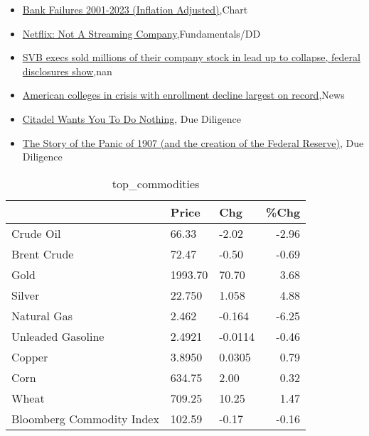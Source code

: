 \documentclass{article}%
\begin{document}
%
\begin{itemize}%
\item%
\href{https://reddit.com/r/wallstreetbets/comments/11ukpfj/bank\_failures\_20012023\_inflation\_adjusted/}{Bank Failures 2001-2023 (Inflation Adjusted)},Chart%
\item%
\href{https://reddit.com/r/StockMarket/comments/11umsba/netflix\_not\_a\_streaming\_company/}{Netflix: Not A Streaming Company},Fundamentals/DD%
\item%
\href{https://reddit.com/r/Economics/comments/11ufjqs/svb\_execs\_sold\_millions\_of\_their\_company\_stock\_in/}{SVB execs sold millions of their company stock in lead up to collapse, federal disclosures show},nan%
\item%
\href{https://reddit.com/r/Economics/comments/11uegs2/american\_colleges\_in\_crisis\_with\_enrollment/}{American colleges in crisis with enrollment decline largest on record},News%
\item%
\href{https://reddit.com/r/Superstonk/comments/11umfa8/citadel\_wants\_you\_to\_do\_nothing/}{Citadel Wants You To Do Nothing}, Due Diligence%
\item%
\href{https://reddit.com/r/Superstonk/comments/11ukamt/the\_story\_of\_the\_panic\_of\_1907\_and\_the\_creation/}{The Story of the Panic of 1907 (and the creation of the Federal Reserve)}, Due Diligence%
\end{itemize}%


\begin{table}[htbp]%
\caption{top\_commodities}%
\centering%
\begin{adjustbox}{width=1\textwidth}%
\begin{tabular}{lllr}
\toprule
                          &   Price &     Chg &  \%Chg \\
\midrule
               Crude Oil  &   66.33 &   -2.02 & -2.96 \\
             Brent Crude  &   72.47 &   -0.50 & -0.69 \\
                    Gold  & 1993.70 &   70.70 &  3.68 \\
                  Silver  &  22.750 &   1.058 &  4.88 \\
             Natural Gas  &   2.462 &  -0.164 & -6.25 \\
       Unleaded Gasoline  &  2.4921 & -0.0114 & -0.46 \\
                  Copper  &  3.8950 &  0.0305 &  0.79 \\
                    Corn  &  634.75 &    2.00 &  0.32 \\
                   Wheat  &  709.25 &   10.25 &  1.47 \\
Bloomberg Commodity Index &  102.59 &   -0.17 & -0.16 \\
\bottomrule
\end{tabular}
%
\end{adjustbox}%
\end{table}
\end{document}
